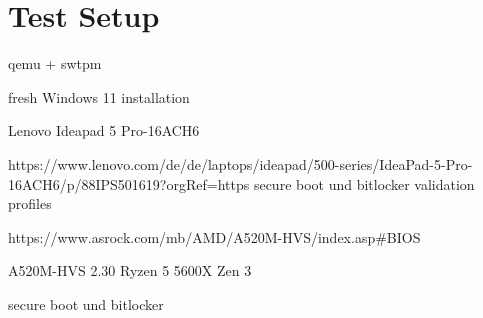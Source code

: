 
\chapter{Test Setup}

qemu + swtpm

fresh Windows 11 installation

Lenovo Ideapad 5 Pro-16ACH6

https://www.lenovo.com/de/de/laptops/ideapad/500-series/IdeaPad-5-Pro-16ACH6/p/88IPS501619?orgRef=https%
secure boot und bitlocker
validation profiles

https://www.asrock.com/mb/AMD/A520M-HVS/index.asp#BIOS

A520M-HVS 2.30
Ryzen 5 5600X Zen 3

secure boot und bitlocker